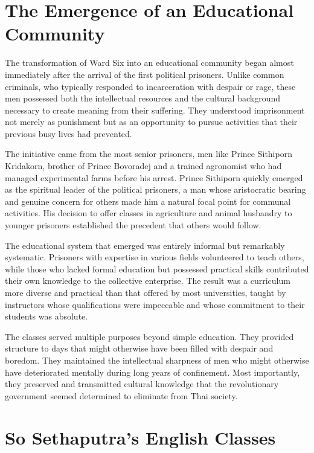 \documentclass[
  Letterpaper,
]{scrbook}
\begin{document}
\section{The Emergence of an Educational
Community}\label{the-emergence-of-an-educational-community}

The transformation of Ward Six into an educational community began
almost immediately after the arrival of the first political prisoners.
Unlike common criminals, who typically responded to incarceration with
despair or rage, these men possessed both the intellectual resources and
the cultural background necessary to create meaning from their
suffering. They understood imprisonment not merely as punishment but as
an opportunity to pursue activities that their previous busy lives had
prevented.

The initiative came from the most senior prisoners, men like Prince
Sithiporn Kridakorn, brother of Prince Bovoradej and a trained
agronomist who had managed experimental farms before his arrest. Prince
Sithiporn quickly emerged as the spiritual leader of the political
prisoners, a man whose aristocratic bearing and genuine concern for
others made him a natural focal point for communal activities. His
decision to offer classes in agriculture and animal husbandry to younger
prisoners established the precedent that others would follow.

The educational system that emerged was entirely informal but remarkably
systematic. Prisoners with expertise in various fields volunteered to
teach others, while those who lacked formal education but possessed
practical skills contributed their own knowledge to the collective
enterprise. The result was a curriculum more diverse and practical than
that offered by most universities, taught by instructors whose
qualifications were impeccable and whose commitment to their students
was absolute.

The classes served multiple purposes beyond simple education. They
provided structure to days that might otherwise have been filled with
despair and boredom. They maintained the intellectual sharpness of men
who might otherwise have deteriorated mentally during long years of
confinement. Most importantly, they preserved and transmitted cultural
knowledge that the revolutionary government seemed determined to
eliminate from Thai society.

\section{So Sethaputra's English
Classes}\label{so-sethaputras-english-classes}
\end{document}
